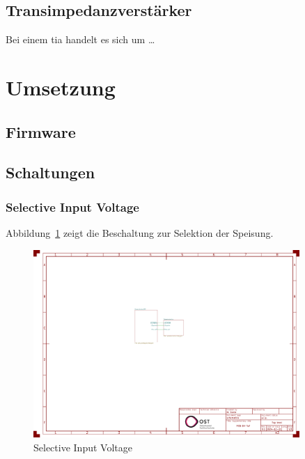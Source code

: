 \documentclass[11pt,a4paper,hidelinks]{article}
\begin{document}
\pagebreak

\subsection{Transimpedanzverstärker}

Bei einem \acrfull{tia} handelt es sich um \dots

\pagebreak

\section{Umsetzung}

\subsection{Firmware}

\pagebreak

\subsection{Schaltungen}

\subsubsection{Selective Input Voltage}

Abbildung~\ref{fig:selective_input_voltage} zeigt die Beschaltung zur Selektion der Speisung.

\begin{figure}[H]
    \centering
    \includegraphics[page=2, trim=80 590 750 50, clip, width=0.9\textwidth]{attachments/schematic.pdf}
    \caption{Selective Input Voltage}\label{fig:selective_input_voltage}
\end{figure}
\end{document}

